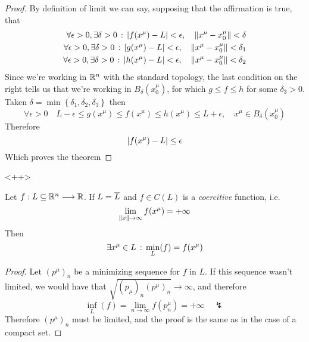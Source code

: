 \documentclass[../complete.tex]{subfiles}
\begin{document}
\begin{proof}
	By definition of limit we can say, supposing that the affirmation is true, that
	\begin{equation*}
		\begin{aligned}
			\forall\epsilon>0, \exists\delta>0\, :\, \abs{f(x^\mu)-L}<\epsilon,\quad\norm{x^\mu-x^\mu_0}<\delta\\
			\forall\epsilon>0, \exists\delta>0\, :\, \abs{g(x^\mu)-L}<\epsilon,\quad\norm{x^\mu-x^\mu_0}<\delta_1\\
			\forall\epsilon>0, \exists\delta>0\, :\, \abs{h(x^\mu)-L}<\epsilon,\quad\norm{x^\mu-x^\mu_0}<\delta_2\\
		\end{aligned}
	\end{equation*}
	Since we're working in $\mathbb{R}^n$ with the standard topology, the last condition on the right tells us that we're working in $B_\delta(x_0^\mu)$, for which $g\le f\le h$ for some $\delta_3>0$.\\
	Taken $\delta=\min\left\{ \delta_1,\delta_2,\delta_3 \right\}$ then
	\begin{equation*}
		\forall\epsilon>0\quad L-\epsilon\le g(x^\mu)\le f(x^\mu)\le h(x^\mu)\le L+\epsilon,\quad x^\mu\in B_\delta(x^\mu_0)
	\end{equation*}
	Therefore
	\begin{equation*}
		\abs{f(x^\mu)-L}\le\epsilon
	\end{equation*}
	Which proves the theorem
\end{proof}<++>
\begin{thm}
	Let $f:L\subseteq\mathbb{R}^n\overset{}{\longrightarrow}\mathbb{R}$. If $L=\overline{L}$ and $f\in C(L)$ is a \textit{coercitive} function, i.e.
	\begin{equation}
		\lim_{\norm{x}\to\infty}f(x^\mu)=+\infty
		\label{eq:coercitivef}
	\end{equation}
	Then
	\begin{equation}
		\exists x^\mu\in L\, :\, \min_L(f)=f(x^\mu)
		\label{eq:closedweierstrass}
	\end{equation}
\end{thm}
\begin{proof}
	Let $(p^\mu)_n$ be a minimizing sequence for $f$ in $L$. If this sequence wasn't limited, we would have that $\sqrt{(p_\mu)_n(p^\mu)_n}\to\infty$, and therefore
	\begin{equation*}
		\inf_L(f)=\lim_{n\to\infty}f(p^\mu_n)=+\infty\quad\lightning
	\end{equation*}
	Therefore $(p^\mu)_n$ must be limited, and the proof is the same as in the case of a compact set.
\end{proof}
\end{document}
